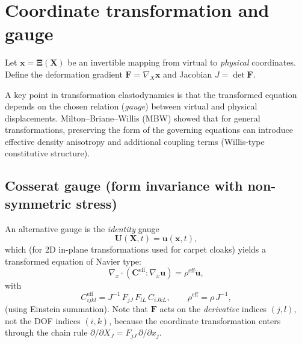 \documentclass[11pt,a4paper]{report}
\begin{document}
\section{Coordinate transformation and gauge}
Let $\bm x = \bm\Xi(\bm X)$ be an invertible mapping from virtual to \emph{physical} coordinates.
Define the deformation gradient $\bm F = \nabla_X \bm x$ and Jacobian $J=\det \bm F$.

A key point in transformation elastodynamics is that the transformed equation depends on the chosen relation
(\emph{gauge}) between virtual and physical displacements. Milton--Briane--Willis (MBW) showed that for general transformations,
preserving the form of the governing equations can introduce effective density anisotropy and additional coupling terms
(Willis-type constitutive structure).

\subsection{Cosserat gauge (form invariance with non-symmetric stress)}
An alternative gauge is the \emph{identity} gauge
\begin{equation}
\bm U(\bm X,t) = \bm u(\bm x,t),
\end{equation}
which (for 2D in-plane transformations used for carpet cloaks) yields a transformed equation of Navier type:
\begin{equation}
\nabla_x \cdot \left(\bm C^{\mathrm{eff}} : \nabla_x \bm u \right) = \rho^{\mathrm{eff}} \ddot{\bm u},
\end{equation}
with
\begin{equation}
C^{\mathrm{eff}}_{ijkl} = J^{-1}\, F_{jJ}\, F_{lL}\, C_{iJkL}, \qquad \rho^{\mathrm{eff}} = \rho\, J^{-1},
\label{eq:cosserat_ceff}
\end{equation}
(using Einstein summation).
Note that $\bm F$ acts on the \emph{derivative} indices $(j,l)$, not the DOF indices $(i,k)$,
because the coordinate transformation enters through the chain rule
$\partial/\partial X_J = F_{jJ}\,\partial/\partial x_j$.
\end{document}
